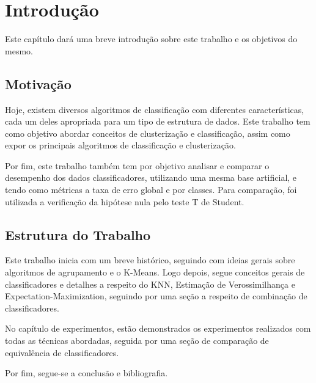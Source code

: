 
\chapter{Introdução}

Este capítulo dará uma breve introdução sobre este trabalho e os objetivos do mesmo.

\section{Motivação}

Hoje, existem diversos algoritmos de classificação com diferentes características, cada um deles apropriada para um tipo de estrutura de dados. Este trabalho tem como objetivo abordar conceitos de clusterização e classificação, assim como expor os principais algoritmos de classificação e clusterização.

Por fim, este trabalho também tem por objetivo analisar e comparar o desempenho dos dados classificadores, utilizando uma mesma base artificial, e tendo como métricas a taxa de erro global e por classes. Para comparação, foi utilizada a verificação da hipótese nula pelo teste T de Student.


\section{Estrutura do Trabalho}
Este trabalho inicia com um breve histórico, seguindo com ideias gerais sobre algoritmos de agrupamento e o K-Means. Logo depois, segue conceitos gerais de classificadores e detalhes a respeito do KNN, Estimação de Verossimilhança e Expectation-Maximization, seguindo por uma seção a respeito de combinação de classificadores.

No capítulo de experimentos, estão demonstrados os experimentos realizados com todas as técnicas abordadas, seguida por uma seção de comparação de equivalência de classificadores.

Por fim, segue-se a conclusão e bibliografia.

